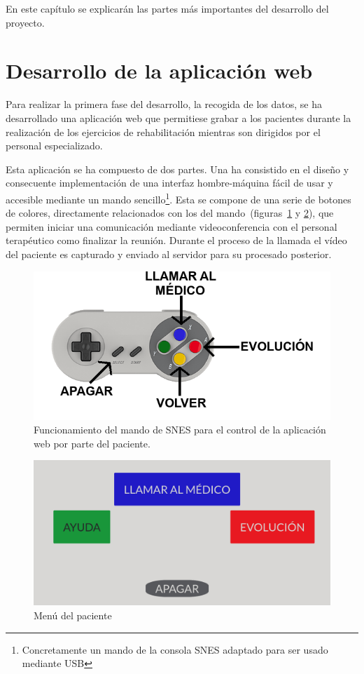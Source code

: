
En este capítulo se explicarán las partes más importantes del desarrollo del proyecto.

\section{Desarrollo de la aplicación web}

Para realizar la primera fase del desarrollo, la recogida de los datos, se ha desarrollado una aplicación web que permitiese grabar a los pacientes durante la realización de los ejercicios de rehabilitación mientras son dirigidos por el personal especializado.

Esta aplicación se ha compuesto de dos partes. Una ha consistido en el diseño y consecuente implementación de una interfaz hombre-máquina fácil de usar y accesible mediante un mando sencillo\footnote{Concretamente un mando de la consola SNES adaptado para ser usado mediante USB}. Esta se compone de una serie de botones de colores, directamente relacionados con los del mando~(figuras~\ref{fig:help} y \ref{fig:menu_paciente}), que permiten iniciar una comunicación mediante videoconferencia con el personal terapéutico como finalizar la reunión. Durante el proceso de la llamada el vídeo del paciente es capturado y enviado al servidor para su procesado posterior.

\begin{figure}
	\centering
	\includegraphics[width=\textwidth]{img/ayuda.png}
	\caption{Funcionamiento del mando de SNES para el control de la aplicación web por parte del paciente.}
	\label{fig:help}
\end{figure}

\begin{figure}
	\centering
	\includegraphics[width=\textwidth]{img/menu_paciente.png}
	\caption{Menú del paciente}
	\label{fig:menu_paciente}
\end{figure}

